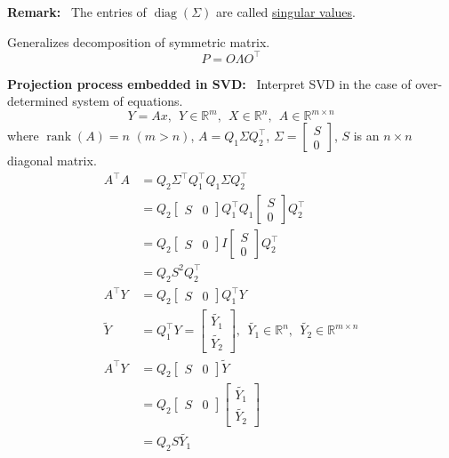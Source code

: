 \documentclass[letterpaper]{article}
\newcommand{\real}{\mathbb R}  %
\begin{document}
\newpage

\noindent \textbf{Remark:}~ The entries of $\operatorname{diag}(\Sigma)$ are called \underline{singular values}.

\noindent Generalizes decomposition of symmetric matrix.
    $$P = O \Lambda O^\top$$

\noindent \textbf{Projection process embedded in SVD:}~ Interpret SVD in the case of over-determined system of equations.
    $$Y = Ax,~~Y \in \real^m,~~X \in \real^n,~~A \in\real^{m \times n}$$
    where $\operatorname{rank}(A)=n$ $(m>n)$, $A = Q_1 \Sigma Q_2^\top$, $\Sigma = \left[ \begin{array}{c} S \\ 0 \end{array} \right]$, $S$ is an $n \times n$ diagonal matrix.
    \begin{align*}
        A^\top A &= Q_2 \Sigma^\top Q_1^\top Q_1 \Sigma Q_2^\top\\
        &= Q_2 \left[ \begin{array}{cc} S & 0 \end{array} \right] Q_1^\top Q_1 \left[ \begin{array}{c} S\\0 \end{array} \right] Q_2^\top\\
        &= Q_2 \left[ \begin{array}{cc} S & 0 \end{array} \right] I \left[ \begin{array}{c} S\\0 \end{array} \right] Q_2^\top\\
        &=Q_2 S^2 Q_2^\top\\
        A^\top Y &= Q_2 \left[ \begin{array}{cc} S & 0 \end{array} \right] Q_1^\top Y\\
        \tilde{Y} &= Q_1^\top Y = \left[ \begin{array}{c} \tilde{Y_1}\\\tilde{Y_2} \end{array} \right], ~~ \tilde{Y_1} \in \real^n, ~~ \tilde{Y_2} \in \real^{m\times n}\\
        A^\top Y &= Q_2 \left[ \begin{array}{cc} S & 0 \end{array} \right] \tilde{Y}\\
        &= Q_2 \left[ \begin{array}{cc} S & 0 \end{array} \right] \left[ \begin{array}{c} \tilde{Y_1}\\\tilde{Y_2} \end{array} \right]\\
        &= Q_2 S \tilde{Y_1}
    \end{align*}
\end{document}
